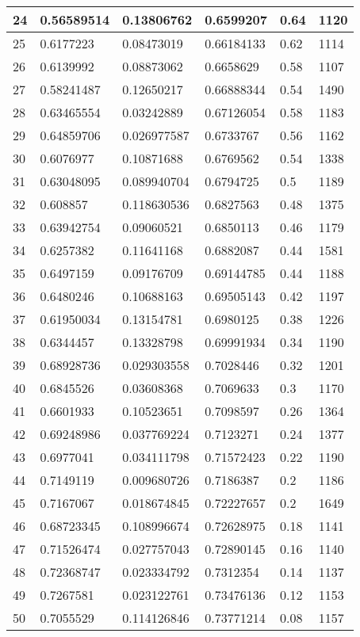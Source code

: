 \begin{longtable}{|l|l|l|l|l|l|}
24 & 0.56589514 & 0.13806762 & 0.6599207 & 0.64 & 1120 \\ \hline 
25 & 0.6177223 & 0.08473019 & 0.66184133 & 0.62 & 1114 \\ \hline 
26 & 0.6139992 & 0.08873062 & 0.6658629 & 0.58 & 1107 \\ \hline 
27 & 0.58241487 & 0.12650217 & 0.66888344 & 0.54 & 1490 \\ \hline 
28 & 0.63465554 & 0.03242889 & 0.67126054 & 0.58 & 1183 \\ \hline 
29 & 0.64859706 & 0.026977587 & 0.6733767 & 0.56 & 1162 \\ \hline 
30 & 0.6076977 & 0.10871688 & 0.6769562 & 0.54 & 1338 \\ \hline 
31 & 0.63048095 & 0.089940704 & 0.6794725 & 0.5 & 1189 \\ \hline 
32 & 0.608857 & 0.118630536 & 0.6827563 & 0.48 & 1375 \\ \hline 
33 & 0.63942754 & 0.09060521 & 0.6850113 & 0.46 & 1179 \\ \hline 
34 & 0.6257382 & 0.11641168 & 0.6882087 & 0.44 & 1581 \\ \hline 
35 & 0.6497159 & 0.09176709 & 0.69144785 & 0.44 & 1188 \\ \hline 
36 & 0.6480246 & 0.10688163 & 0.69505143 & 0.42 & 1197 \\ \hline 
37 & 0.61950034 & 0.13154781 & 0.6980125 & 0.38 & 1226 \\ \hline 
38 & 0.6344457 & 0.13328798 & 0.69991934 & 0.34 & 1190 \\ \hline 
39 & 0.68928736 & 0.029303558 & 0.7028446 & 0.32 & 1201 \\ \hline 
40 & 0.6845526 & 0.03608368 & 0.7069633 & 0.3 & 1170 \\ \hline 
41 & 0.6601933 & 0.10523651 & 0.7098597 & 0.26 & 1364 \\ \hline 
42 & 0.69248986 & 0.037769224 & 0.7123271 & 0.24 & 1377 \\ \hline 
43 & 0.6977041 & 0.034111798 & 0.71572423 & 0.22 & 1190 \\ \hline 
44 & 0.7149119 & 0.009680726 & 0.7186387 & 0.2 & 1186 \\ \hline 
45 & 0.7167067 & 0.018674845 & 0.72227657 & 0.2 & 1649 \\ \hline 
46 & 0.68723345 & 0.108996674 & 0.72628975 & 0.18 & 1141 \\ \hline 
47 & 0.71526474 & 0.027757043 & 0.72890145 & 0.16 & 1140 \\ \hline 
48 & 0.72368747 & 0.023334792 & 0.7312354 & 0.14 & 1137 \\ \hline 
49 & 0.7267581 & 0.023122761 & 0.73476136 & 0.12 & 1153 \\ \hline 
50 & 0.7055529 & 0.114126846 & 0.73771214 & 0.08 & 1157 \\ \hline 
\end{longtable}